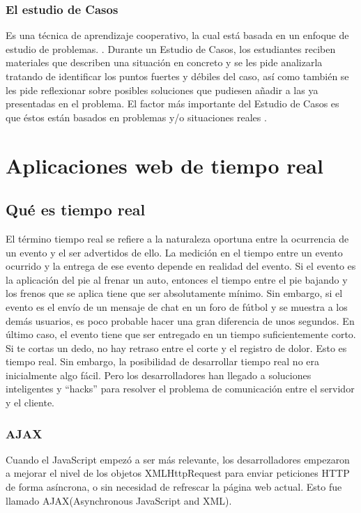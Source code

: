 \subsubsection{El estudio de Casos}
Es una técnica de aprendizaje cooperativo, la cual está basada en un enfoque de estudio de problemas. \cite{JCAL:JCAL119}. Durante un Estudio de Casos, los estudiantes reciben materiales que describen una situación en concreto y se les pide analizarla tratando de identificar los puntos fuertes y débiles del caso, así como también se les pide reflexionar sobre posibles soluciones que pudiesen añadir a las ya presentadas en el problema. El factor más importante del Estudio de Casos es que éstos están basados en problemas y/o situaciones reales \cite{JCAL:JCAL119}.

\section{Aplicaciones web de tiempo real}
\subsection{Qué es tiempo real}
El término tiempo real se refiere a la naturaleza oportuna entre la ocurrencia de un evento y el ser advertidos de ello. La medición en el tiempo entre un evento ocurrido y la entrega de ese evento depende en realidad del evento. Si el evento es la aplicación del pie al frenar un auto, entonces el tiempo entre el pie bajando y los frenos que se aplica tiene que ser absolutamente mínimo. Sin embargo, si el evento es el envío de un mensaje de chat en un foro de fútbol y se muestra a los demás usuarios, es poco probable hacer una gran diferencia de unos segundos. En último caso, el evento tiene que ser entregado en un tiempo suficientemente corto. Si te cortas un dedo, no hay retraso entre el corte y el registro de dolor. Esto es tiempo real. Sin embargo, la posibilidad de desarrollar tiempo real no era inicialmente algo fácil. Pero los desarrolladores han llegado a soluciones inteligentes y ``hacks'' para resolver el problema de comunicación entre el servidor y el cliente.

\subsubsection{AJAX}
Cuando el JavaScript empezó a ser más relevante, los desarrolladores empezaron a mejorar el nivel de los objetos XMLHttpRequest para enviar peticiones HTTP de forma asíncrona, o sin necesidad de refrescar la página web actual. Esto fue llamado AJAX(Asynchronous JavaScript and XML).\\

